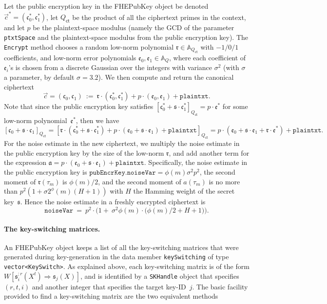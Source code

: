 \documentclass[14pt]{extarticle}
\newcommand{\A}{\mathbb{A}}
\def\Qct{Q_\mathsf{ct}}
\def\FHEPubKey{\textsf{FHEPubKey}}
\def\vc{\vec{c}}
\newcommand{\mfa}{\mathfrak{a}}
\newcommand{\ee}{\mathfrak{e}}
\newcommand{\ct}{\mathfrak{c}}
\newcommand{\rr}{\mathfrak{r}}
\newcommand{\sk}{\mathfrak{s}}
\begin{document}
Let the public encryption key in the {\FHEPubKey} object be denoted
$\vc^*=(\ct_0^*,\ct_1^*)$, let $\Qct$ be the product of all the
ciphertext primes in the context, and let $p$ be the plaintext-space
modulus (namely the GCD of the parameter \texttt{ptxtSpace} and the
plaintext-space modulus from the public encryption key). The
\texttt{Encrypt} method chooses a random low-norm polynomial $\rr\in
\A_{\Qct}$ with $-1/0/1$ coefficients, and low-norm error polynomials
$\ee_0,\ee_1\in\A_Q$, where each coefficient of $\ee_i$'s is chosen
from a discrete Gaussian over the integers with variance $\sigma^2$
(with $\sigma$ a parameter, by default $\sigma=3.2$). We then compute
and return the canonical ciphertext
\[
\vc = (\ct_0,\ct_1) ~:=~ \rr \cdot(\ct_0^*,\ct_1^*) + p\cdot(\ee_0,\ee_1)
+ \mathtt{plaintxt}.
\]
Note that since the public encryption key satisfies $[\ct_0^*+\sk\cdot
\ct_1^*]_{\Qct}=p\cdot\ee^*$ for some low-norm polynomial~$\ee^*$,
then we have
\[
[\ct_0+\sk\cdot\ct_1]_{\Qct} 
= \left[\rr\cdot(\ct_0^*+\sk\cdot\ct_1^*)+p\cdot(\ee_0+\sk\cdot\ee_1)
        + \mathtt{plaintxt}\right]_{\Qct}
= p\cdot(\ee_0+\sk\cdot\ee_1+\rr\cdot\ee^*) + \mathtt{plaintxt}.
\]
For the noise estimate in the new ciphertext, we multiply the noise
estimate in the public encryption key by the size of the low-norm
$\rr$, and add another term for the expression $\mfa=p\cdot(\ee_0+
\sk\cdot\ee_1)+\mathtt{plaintxt}$. Specifically, the noise estimate
in the public encryption key is $\mathtt{pubEncrKey.noiseVar}=\phi(m)
\sigma^2 p^2$, the second moment of $\rr(\tau_m)$ is $\phi(m)/2$, and
the second moment of $a(\tau_m)$ is no more than $p^2(1+\sigma2^\phi(m)
(H+1))$ with $H$ the Hamming weight of the secret key~$\sk$. Hence the
noise estimate in a freshly encrypted ciphertext is
\[
\mathtt{noiseVar}
~=~ p^2\cdot\big(1+~\sigma^2\phi(m)\cdot\big(\phi(m)/2 + H + 1\big)\big).
\]

\paragraph{The key-switching matrices.} An {\FHEPubKey} object keeps
a list of all the key-switching matrices that were generated during
key-generation in the data member \texttt{keySwitching} of type
\texttt{vector<KeySwitch>}. As explained above, each key-switching
matrix is of the form $W[\sk_i^{;r}(X^t)\Rightarrow\sk_j(X)]$, and
is identified by a \texttt{SKHandle} object that specifies $(r,t,i)$
and another integer that specifies the target key-ID~$j$. The basic
facility provided to find a key-switching matrix are the two
equivalent methods
\end{document}
